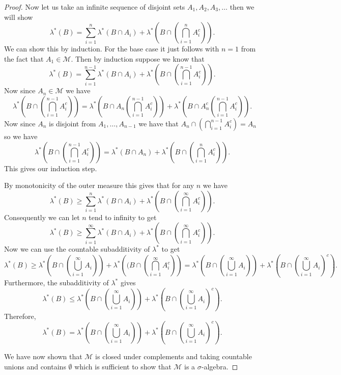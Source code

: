 \documentclass[11pt]{article}
\theoremstyle{definition}
\theoremstyle{remark}
\begin{document}
\begin{proof}
Now let us take an infinite sequence of disjoint sets $A_1, A_2, A_3, \dots$ then we will show 
\[ \lambda^*(B) = \sum_{i=1}^n \lambda^* (B \cap A_i) + \lambda^*\left( B \cap \left( \bigcap_{i=1}^n A_i^c \right) \right). \] We can show this by induction. For the base case it just follows with $n=1$ from the fact that $A_1 \in \mathscr{M}$. Then by induction suppose we know that
\[ \lambda^*(B) = \sum_{i=1}^{n-1} \lambda^*(B \cap A_i) + \lambda^*\left( B \cap \left( \bigcap_{i=1}^{n-1} A_i^c \right) \right).  \] Now since $A_n \in \mathscr{M}$ we have
\[ \lambda^*\left( B \cap \left( \bigcap_{i=1}^{n-1} A_i^c \right) \right) = \lambda^* \left(B \cap A_n \left( \bigcap_{i=1}^{n-1} A_i^c \right)  \right) + \lambda^* \left( B \cap A_n^c \left( \bigcap_{i=1}^{n-1} A_i^c \right) \right).\] Now since $A_n$ is disjoint from $A_1, \dots, A_{n-1}$ we have that $A_n \cap \left( \bigcap_{i=1}^{n-1} A_i^c \right)  = A_n$ so we have \[  \lambda^*\left( B \cap \left( \bigcap_{i=1}^{n-1} A_i^c \right) \right) = \lambda^*(B \cap A_n) + \lambda^*\left( B \cap \left( \bigcap_{i=1}^{n} A_i^c \right) \right). \] This gives our induction step. 

By monotonicity of the outer measure this gives that for any $n$ we have
\[ \lambda^*(B) \geq \sum_{i=1}^n \lambda^*(B \cap A_i) + \lambda^* \left(B \cap \left( \bigcap_{i=1}^\infty A_i^c \right) \right). \] Consequently we can let $n$ tend to infinity to get
\[ \lambda^*(B) \geq \sum_{i=1}^\infty \lambda^*(B \cap A_i) +\lambda^* \left(B \cap \left( \bigcap_{i=1}^\infty A_i^c \right) \right). \] Now we can use the countable subadditivity of $\lambda^*$ to get
\[ \lambda^*(B) \geq \lambda^*\left( B \cap \left( \bigcup_{i=1}^\infty A_i \right)\right) + \lambda^*\left((B \cap \left( \bigcap_{i=1}^\infty A_i^c \right) \right) = \lambda^* \left( B \cap \left( \bigcup_{i=1}^\infty A_i \right) \right) + \lambda^* \left( B \cap \left( \bigcup_{i=1}^\infty A_i \right)^c \right).\] Furthermore, the subadditivity of $\lambda^*$ gives
\[ \lambda^*(B) \leq  \lambda^* \left( B \cap \left( \bigcup_{i=1}^\infty A_i \right) \right) + \lambda^* \left( B \cap \left( \bigcup_{i=1}^\infty A_i \right)^c \right). \] Therefore, 
\[ \lambda^*(B) =  \lambda^* \left( B \cap \left( \bigcup_{i=1}^\infty A_i \right) \right) + \lambda^* \left( B \cap \left( \bigcup_{i=1}^\infty A_i \right)^c \right). \]

We have now shown that $\mathscr{M}$ is closed under complements and taking countable unions and contains $\emptyset$ which is sufficient to show that $\mathscr{M}$ is a $\sigma$-algebra.
\end{proof}
\end{document}
